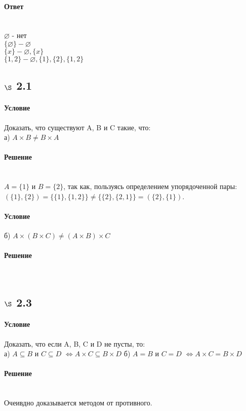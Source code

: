 \documentclass[a4paper,12pt]{article}
\begin{document}
\paragraph*{Ответ} \mbox{}\\
$\varnothing $ - нет\\
$\{ \varnothing \} - \varnothing$\\ 
$\{ x \} - \varnothing, \{x\}$\\
$\{1, 2\} - \varnothing, \{1\}, \{2\}, \{1, 2\}$

\subsection*{$\S$ 2.1}
\paragraph*{Условие}
Доказать, что существуют A, B и C такие, что:\\
а) $A \times B \neq B \times A$
\paragraph*{Решение} \mbox{}\\
$A = \{1\}$ и $B = \{2\}$, так как, пользуясь определением упорядоченной пары: $ (\{1\},\{2\}) = \{\{1\},\{1,2\}\} \ne \{\{2\},\{2,1\}\} = (\{2\},\{1\})$. 
\paragraph*{Условие}
б) $A \times (B \times C) \neq (A \times B) \times C$
\paragraph*{Решение} \mbox{}\\

\subsection*{$\S$ 2.3}
\paragraph*{Условие}
Доказать, что если A, B, C и D не пусты, то:\\
а) $A \subseteq B$ и $ C \subseteq D $ $\Leftrightarrow A \times C \subseteq B \times D$
б) $A = B$ и $ C = D $ $\Leftrightarrow A \times C = B \times D$
\paragraph*{Решение} \mbox{}\\
Очеивдно доказывается методом от противного.
\end{document}
